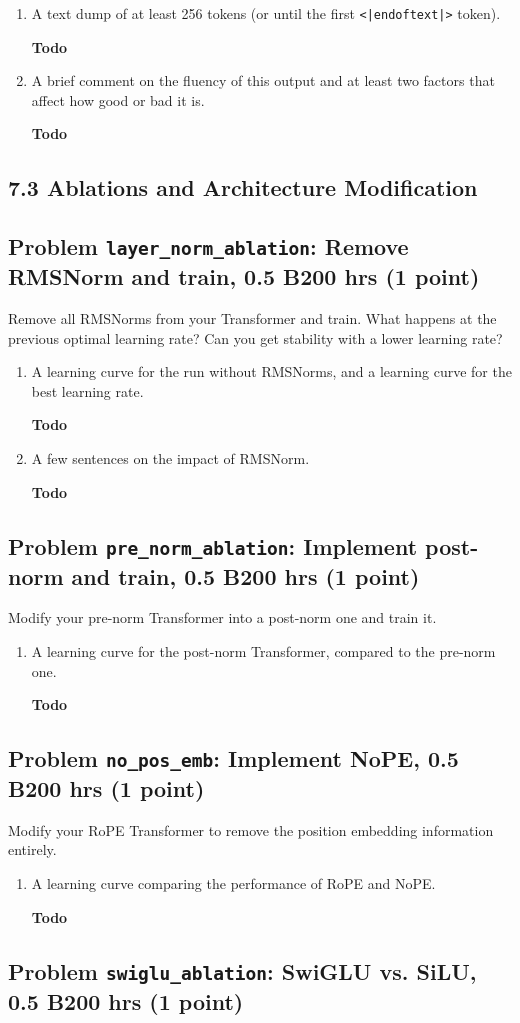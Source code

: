 \documentclass[11pt]{article}
\newcommand{\Todo}{\par\textbf{Todo}\par}
\newcommand{\problem}[2]{%
  \subsection*{Problem \texttt{#1}: #2}%
}
\begin{document}
\begin{enumerate}[label=(\alph*)]
  \item A text dump of at least 256 tokens (or until the first \texttt{<|endoftext|>} token).
  \Todo
  \item A brief comment on the fluency of this output and at least two factors that affect how good or bad it is.
  \Todo
\end{enumerate}

\subsection*{7.3 Ablations and Architecture Modification}

\problem{layer\_norm\_ablation}{Remove RMSNorm and train, 0.5 B200 hrs (1 point)}

Remove all RMSNorms from your Transformer and train. What happens at the previous optimal learning rate? Can you get stability with a lower learning rate?

\begin{enumerate}[label=(\alph*)]
  \item A learning curve for the run without RMSNorms, and a learning curve for the best learning rate.
  \Todo
  \item A few sentences on the impact of RMSNorm.
  \Todo
\end{enumerate}

\problem{pre\_norm\_ablation}{Implement post-norm and train, 0.5 B200 hrs (1 point)}

Modify your pre-norm Transformer into a post-norm one and train it.

\begin{enumerate}[label=(\alph*)]
  \item A learning curve for the post-norm Transformer, compared to the pre-norm one.
  \Todo
\end{enumerate}

\problem{no\_pos\_emb}{Implement NoPE, 0.5 B200 hrs (1 point)}

Modify your RoPE Transformer to remove the position embedding information entirely.

\begin{enumerate}[label=(\alph*)]
  \item A learning curve comparing the performance of RoPE and NoPE.
  \Todo
\end{enumerate}

\problem{swiglu\_ablation}{SwiGLU vs. SiLU, 0.5 B200 hrs (1 point)}
\end{document}
